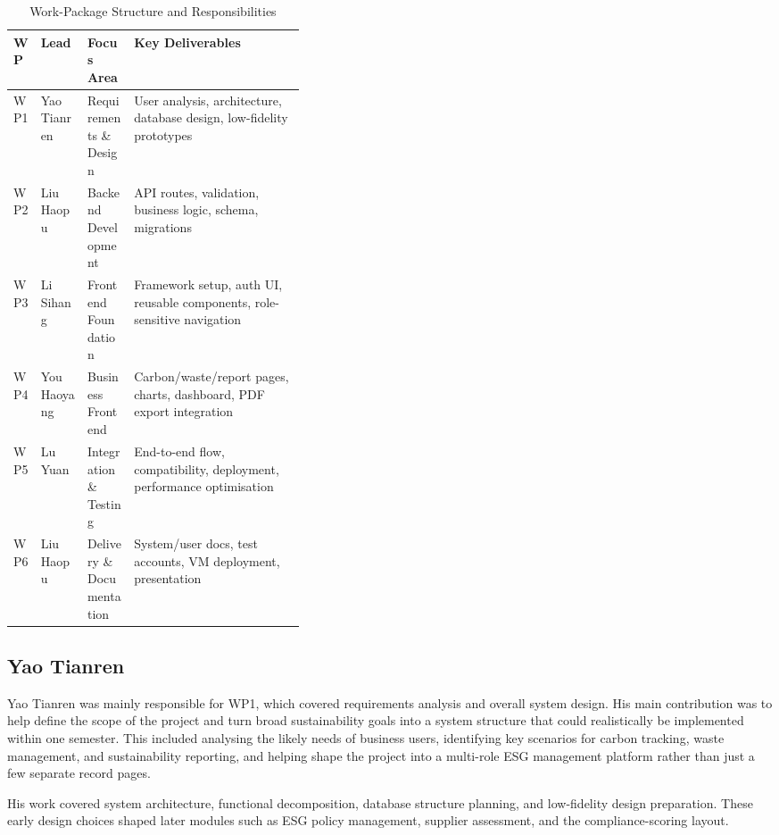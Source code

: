 \documentclass[11pt,a4paper]{article}
\begin{document}
\begin{table}[h]
\centering
\scriptsize
\begin{tabularx}{\linewidth}{@{}p{0.06\linewidth}p{0.16\linewidth}p{0.16\linewidth}X@{}}
\toprule
\textbf{WP} & \textbf{Lead} & \textbf{Focus Area} & \textbf{Key Deliverables} \\
\midrule
WP1 & Yao Tianren   & Requirements \& Design  & User analysis, architecture, database design, low-fidelity prototypes \\
WP2 & Liu Haopu     & Backend Development     & API routes, validation, business logic, schema, migrations \\
WP3 & Li Sihang     & Frontend Foundation     & Framework setup, auth UI, reusable components, role-sensitive navigation \\
WP4 & You Haoyang   & Business Frontend       & Carbon/waste/report pages, charts, dashboard, PDF export integration \\
WP5 & Lu Yuan       & Integration \& Testing  & End-to-end flow, compatibility, deployment, performance optimisation \\
WP6 & Liu Haopu     & Delivery \& Documentation & System/user docs, test accounts, VM deployment, presentation \\
\bottomrule
\end{tabularx}
\caption{Work-Package Structure and Responsibilities}
\end{table}

\subsection{Yao Tianren}
Yao Tianren was mainly responsible for WP1, which covered requirements analysis and overall system design. His main contribution was to help define the scope of the project and turn broad sustainability goals into a system structure that could realistically be implemented within one semester. This included analysing the likely needs of business users, identifying key scenarios for carbon tracking, waste management, and sustainability reporting, and helping shape the project into a multi-role ESG management platform rather than just a few separate record pages.

His work covered system architecture, functional decomposition, database structure planning, and low-fidelity design preparation. These early design choices shaped later modules such as ESG policy management, supplier assessment, and the compliance-scoring layout.
\end{document}
